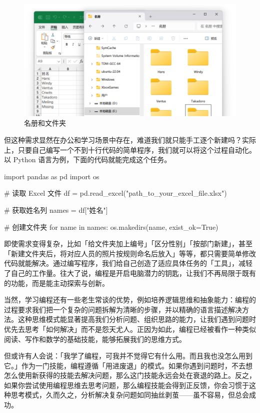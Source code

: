\begin{figure}[htb!]
  \centering
  \includegraphics[width=.75\textwidth]{assets/surpass/Sheet_and_folders.png}
  \caption{名册和文件夹}
  \label{fig:Sheet_and_folders}
\end{figure}

但这种需求显然在办公和学习场景中存在，难道我们就只能手工逐个新建吗？实际上，只要自己编写一个不到十行代码的简单程序，我们就可以将这个过程自动化。以 Python 语言为例，下面的代码就能完成这个任务。

\begin{MissingVerbatim}[python]
  import pandas as pd
  import os

  # 读取 Excel 文件
  df = pd.read_excel("path_to_your_excel_file.xlsx")

  # 获取姓名列
  names = df["姓名"]

  # 创建文件夹
  for name in names:
      os.makedirs(name, exist_ok=True)
\end{MissingVerbatim}

即使需求变得复杂，比如「给文件夹加上编号」「区分性别」「按部门新建」，甚至「新建文件夹后，将对应人员的照片按规则命名后放入」等等，都只需要简单修改代码就能解决。通过编写程序，我们给自己创造了适应具体任务的「工具」，减轻了自己的工作量。往大了说，编程是开启电脑潜力的钥匙，让我们不再局限于既有的功能，而是能主动探索与创新。

当然，学习编程还有一些老生常谈的优势，例如培养逻辑思维和抽象能力：编程的过程要求我们把一个复杂的问题拆解为清晰的步骤，并以精确的语言描述解决方法。这种思维模式能显著提高我们分析问题、组织思路的能力，让我们遇到问题时优先去思考「如何解决」而不是怨天尤人。正因为如此，编程已经被看作一种类似阅读、写作和数学的基础技能，能够拓展我们的思维方式。

但或许有人会说：「我学了编程，可我并不觉得它有什么用。而且我也没怎么用到它。」作为一门技能，编程遵循「用进废退」的模式。如果你遇到问题时，不去想怎么使用新获得的技能去解决问题，那么这门技能永远会处在衰退的路上。反之，如果你尝试使用编程思维去思考问题，那么编程技能会得到正反馈，你会习惯于这种思考模式，久而久之，分析解决复杂问题如同抽丝剥茧——虽不容易，但总会成功。

